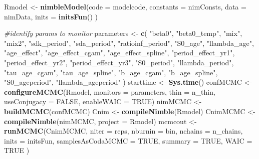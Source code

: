 \documentclass[11pt,]{article}
\newenvironment{Shaded}{\begin{snugshade}}{\end{snugshade}}
\newcommand{\KeywordTok}[1]{\textcolor[rgb]{0.13,0.29,0.53}{\textbf{#1}}}
\newcommand{\DataTypeTok}[1]{\textcolor[rgb]{0.13,0.29,0.53}{#1}}
\newcommand{\StringTok}[1]{\textcolor[rgb]{0.31,0.60,0.02}{#1}}
\newcommand{\CommentTok}[1]{\textcolor[rgb]{0.56,0.35,0.01}{\textit{#1}}}
\newcommand{\OtherTok}[1]{\textcolor[rgb]{0.56,0.35,0.01}{#1}}
\newcommand{\NormalTok}[1]{#1}
\begin{document}
\begin{Shaded}
\begin{Highlighting}[]
\NormalTok{Rmodel <-}\StringTok{ }\KeywordTok{nimbleModel}\NormalTok{(}\DataTypeTok{code =}\NormalTok{ modelcode,}
                      \DataTypeTok{constants =}\NormalTok{ nimConsts,}
                      \DataTypeTok{data =}\NormalTok{ nimData,}
                      \DataTypeTok{inits =} \KeywordTok{initsFun}\NormalTok{()}
\NormalTok{                      )}

\CommentTok{#identify params to monitor}
\NormalTok{parameters <-}\StringTok{ }\KeywordTok{c}\NormalTok{(}
              \StringTok{"beta0"}\NormalTok{,}
              \StringTok{"beta0_temp"}\NormalTok{,}
              \StringTok{"mix"}\NormalTok{,}
              \StringTok{"mix2"}\NormalTok{,}
              \StringTok{"sdk_period"}\NormalTok{,}
              \StringTok{"sda_period"}\NormalTok{,}
              \StringTok{"ratioinf_period"}\NormalTok{,}
              \StringTok{"S0_age"}\NormalTok{,}
              \StringTok{"llambda_age"}\NormalTok{,}
              \StringTok{"age_effect"}\NormalTok{,}
              \StringTok{"age_effect_cgam"}\NormalTok{,}
              \StringTok{"age_effect_spline"}\NormalTok{,}
              \StringTok{"period_effect_yr1"}\NormalTok{,}
              \StringTok{"period_effect_yr2"}\NormalTok{,}
              \StringTok{"period_effect_yr3"}\NormalTok{,}
              \StringTok{"S0_period"}\NormalTok{,}
              \StringTok{"llambda_period"}\NormalTok{,}
              \StringTok{"tau_age_cgam"}\NormalTok{,}
              \StringTok{"tau_age_spline"}\NormalTok{,}
              \StringTok{"b_age_cgam"}\NormalTok{,}
              \StringTok{"b_age_spline"}\NormalTok{,}
              \StringTok{"S0_ageperiod"}\NormalTok{,}
              \StringTok{"llambda_ageperiod"}
\NormalTok{)}
\NormalTok{starttime <-}\StringTok{ }\KeywordTok{Sys.time}\NormalTok{()}
\NormalTok{confMCMC <-}\StringTok{ }\KeywordTok{configureMCMC}\NormalTok{(Rmodel,}
                          \DataTypeTok{monitors =}\NormalTok{ parameters,}
                          \DataTypeTok{thin =}\NormalTok{ n_thin,}
                          \DataTypeTok{useConjugacy =} \OtherTok{FALSE}\NormalTok{,}
                          \DataTypeTok{enableWAIC =} \OtherTok{TRUE}\NormalTok{)}
\NormalTok{nimMCMC <-}\StringTok{ }\KeywordTok{buildMCMC}\NormalTok{(confMCMC)}
\NormalTok{Cnim <-}\StringTok{ }\KeywordTok{compileNimble}\NormalTok{(Rmodel)}
\NormalTok{CnimMCMC <-}\StringTok{ }\KeywordTok{compileNimble}\NormalTok{(nimMCMC,}
                          \DataTypeTok{project =}\NormalTok{ Rmodel)}
\NormalTok{mcmcout <-}\StringTok{ }\KeywordTok{runMCMC}\NormalTok{(CnimMCMC,}
                   \DataTypeTok{niter =}\NormalTok{ reps,}
                   \DataTypeTok{nburnin =}\NormalTok{ bin,}
                   \DataTypeTok{nchains =}\NormalTok{ n_chains,}
                   \DataTypeTok{inits =}\NormalTok{ initsFun,}
                   \DataTypeTok{samplesAsCodaMCMC =} \OtherTok{TRUE}\NormalTok{,}
                   \DataTypeTok{summary =} \OtherTok{TRUE}\NormalTok{,}
                   \DataTypeTok{WAIC =} \OtherTok{TRUE}
\NormalTok{                   )}


\end{Highlighting}
\end{Shaded}
\end{document}

